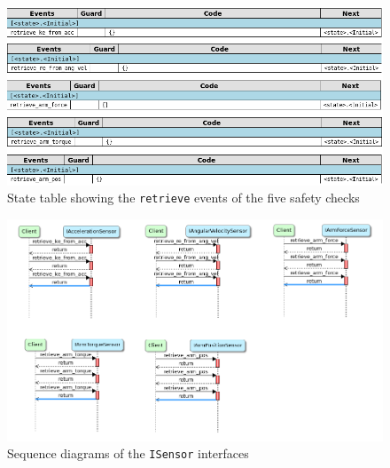 \documentclass[12pt]{scrreprt}
\begin{document}
\begin{appendices}
\begin{figure}[H]
    \centering
    \includegraphics[width=\textwidth]{Figures/results/modelling_figures/ISensor/ISensor_state_table.png}
    \caption{State table showing the \texttt{retrieve} events of the five safety checks}
    \label{fig:retrieve events}
\end{figure}

\begin{figure}[H]
    \centering
    \includegraphics[width=\textwidth]{Figures/results/modelling_figures/ISensor/ISensor_seq.png}
    \caption{Sequence diagrams of the \texttt{ISensor} interfaces}
    \label{fig:isensor_seq}
\end{figure}


\end{appendices}
\end{document}
